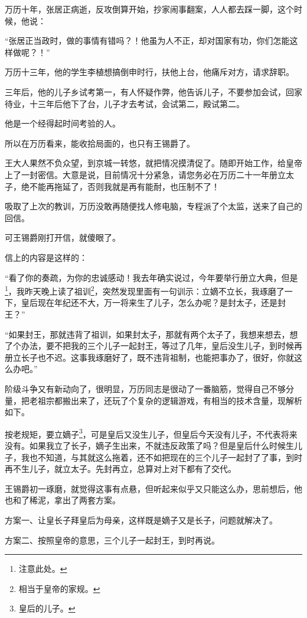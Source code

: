 \begin{multicols}{\theparacolNo}
万历十年，张居正病逝，反攻倒算开始，抄家闹事翻案，人人都去踩一脚，这个时候，他说：

“张居正当政时，做的事情有错吗？！他虽为人不正，却对国家有功，你们怎能这样做呢？！”

万历十三年，他的学生李植想搞倒申时行，扶他上台，他痛斥对方，请求辞职。

三年后，他的儿子乡试考第一，有人怀疑作弊，他告诉儿子，不要参加会试，回家待业，十三年后他下了台，儿子才去考试，会试第二，殿试第二。

他是一个经得起时间考验的人。

所以在万历看来，能收拾局面的，也只有王锡爵了。

王大人果然不负众望，到京城一转悠，就把情况摸清促了。随即开始工作，给皇帝上了一封密信。大意是说，目前情况十分紧急，请您务必在万历二十一年册立太子，绝不能再拖延了，否则我就是再有能耐，也压制不了！

吸取了上次的教训，万历没敢再随便找人修电脑，专程派了个太监，送来了自己的回信。

可王锡爵刚打开信，就傻眼了。

信上的内容是这样的：

“看了你的奏疏，为你的忠诚感动！我去年确实说过，今年要举行册立大典，但是\footnote{注意此处。}，我昨天晚上读了祖训\footnote{相当于皇帝的家规。}，突然发现里面有一句训示：立嫡不立长，我琢磨了一下，皇后现在年纪还不大，万一将来生了儿子，怎么办呢？是封太子，还是封王？”

“如果封王，那就违背了祖训，如果封太子，那就有两个太子了，我想来想去，想了个办法，要不把我的三个儿子一起封王，等过了几年，皇后没生儿子，到时候再册立长子也不迟。这事我琢磨好了，既不违背祖制，也能把事办了，很好，你就这么办吧。”

阶级斗争又有新动向了，很明显，万历同志是很动了一番脑筋，觉得自己不够分量，把老祖宗都搬出来了，还玩了个复杂的逻辑游戏，有相当的技术含量，现解析如下。

按老规矩，要立嫡子\footnote{皇后的儿子。}，可是皇后又没生儿子，但皇后今天没有儿子，不代表将来没有。如果我立了长子，嫡子生出来，不就违反政策了吗？但是皇后什么时候生儿子，我也不知道，与其就这么拖着，还不如把现在的三个儿子一起封了了事，到时再不生儿子，就立太子。先封再立，总算对上对下都有了交代。

王锡爵初一琢磨，就觉得这事有点悬，但听起来似乎又只能这么办，思前想后，他也和了稀泥，拿出了两套方案。

方案一、让皇长子拜皇后为母亲，这样既是嫡子又是长子，问题就解决了。

方案二、按照皇帝的意思，三个儿子一起封王，到时再说。


\end{multicols}
